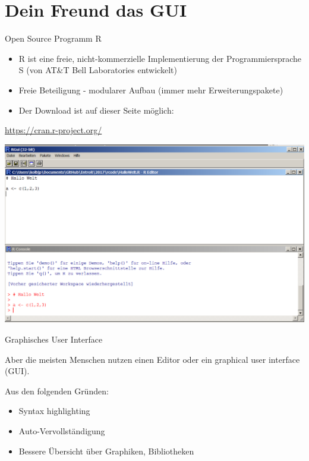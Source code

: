 \documentclass[
  ignorenonframetext,
]{beamer}
\providecommand{\tightlist}{%
  \setlength{\itemsep}{0pt}\setlength{\parskip}{0pt}}
\begin{document}
\hypertarget{dein-freund-das-gui}{%
\section{Dein Freund das GUI}\label{dein-freund-das-gui}}

\begin{frame}{Open Source Programm R}
\protect\hypertarget{open-source-programm-r}{}

\begin{itemize}
\item
  R ist eine freie, nicht-kommerzielle Implementierung der
  Programmiersprache S (von AT\&T Bell Laboratories entwickelt)
\item
  Freie Beteiligung - modularer Aufbau (immer mehr Erweiterungspakete)
\item
  Der Download ist auf dieser Seite möglich:
\end{itemize}

\url{https://cran.r-project.org/}

\includegraphics{figure/BasisR.PNG}

\end{frame}

\begin{frame}{Graphisches User Interface}
\protect\hypertarget{graphisches-user-interface}{}

Aber die meisten Menschen nutzen einen Editor oder ein graphical user
interface (GUI).

Aus den folgenden Gründen:

\begin{itemize}
\tightlist
\item
  Syntax highlighting
\item
  Auto-Vervollständigung
\item
  Bessere Übersicht über Graphiken, Bibliotheken
\end{itemize}

\end{frame}
\end{document}
